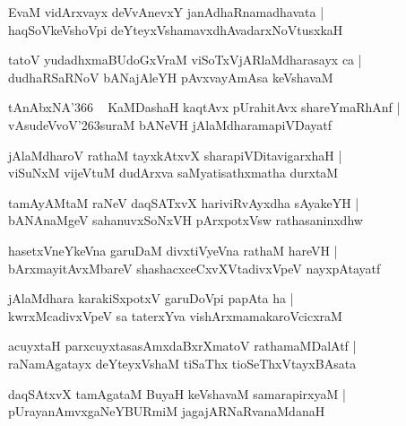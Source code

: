 \documentclass[twoside,12pt,openright]{book}
\def\S{\char'263}
\newcounter{shloka}[chapter]
\begin{document}
\begin{shloka}%
EvaM vidArxvayx deVvAnevxY janAdhaRnamadhavata |\\
haqSoVkeVshoVpi deYteyxVshamavxdhAvadarxNoVtusxkaH 
\end{shloka}

\begin{shloka}%
tatoV yudadhxmaBUdoGxVraM viSoTxVjARlaMdharasayx ca |\\
dudhaRSaRNoV bANajAleYH pAvxvayAmAsa keVshavaM 
\end{shloka}%

\begin{shloka}%
tAnAbxNA\char'366 ~ KaMDashaH kaqtAvx pUrahitAvx shareYmaRhAnf |\\
vAsudeVvoV\S suraM bANeVH jAlaMdharamapiVDayatf
\end{shloka}

\begin{shloka}%
jAlaMdharoV rathaM tayxkAtxvX sharapiVDitavigarxhaH |\\
viSuNxM vijeVtuM dudArxva saMyatisathxmatha durxtaM 
\end{shloka}

\begin{shloka}%
tamAyAMtaM raNeV daqSATxvX hariviRvAyxdha sAyakeYH |\\
bANAnaMgeV sahanuvxSoNxVH pArxpotxVsw rathasaninxdhw
\end{shloka}

\begin{shloka}%
hasetxVneYkeVna garuDaM divxtiVyeVna rathaM hareVH |\\
bArxmayitAvxMbareV shashacxceCxvXVtadivxVpeV nayxpAtayatf
\end{shloka}

\begin{shloka}%
jAlaMdhara karakiSxpotxV garuDoVpi papAta ha |\\
kwrxMcadivxVpeV sa taterxYva vishArxmamakaroVcicxraM 
\end{shloka}

\begin{shloka}%
acuyxtaH parxcuyxtasasAmxdaBxrXmatoV rathamaMDalAtf |\\
raNamAgatayx deYteyxVshaM tiSaThx tioSeThxVtayxBAsata
\end{shloka}

\begin{shloka}%
daqSAtxvX tamAgataM BuyaH keVshavaM samarapirxyaM |\\
pUrayanAmvxgaNeYBURmiM jagajARNaRvanaMdanaH
\end{shloka}
\end{document}
